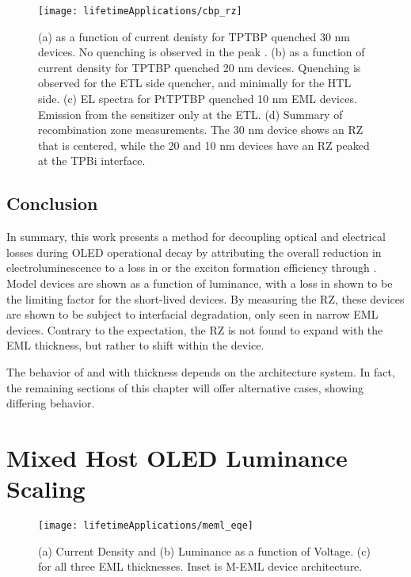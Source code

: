 \documentclass[../thesis.tex]{subfiles}
\begin{document}
\begin{figure}[ht]
\centering
\texttt{[image: lifetimeApplications/cbp\_rz]}
\caption{(a) \eqe as a function of current denisty for TPTBP quenched 30 nm devices.  No quenching is observed in the peak \eqe.  (b) \eqe as a function of current density for TPTBP quenched 20 nm devices.  Quenching is observed for the ETL side quencher, and minimally for the HTL side. (c) EL spectra for PtTPTBP quenched 10 nm EML devices. Emission from the sensitizer only at the ETL. (d) Summary of recombination zone measurements. The 30 nm device shows an RZ that is centered, while the 20 and 10 nm devices have an RZ peaked at the TPBi interface.}
\label{fig:cbp_rz}
\end{figure}

\subsection{Conclusion}

In summary, this work presents a method for decoupling optical and electrical losses during OLED operational decay by attributing the overall reduction in electroluminescence to a loss in \pl or the exciton formation efficiency through \ef.  
Model devices are shown as a function of luminance, with a loss in \ef shown to be the limiting factor for the short-lived devices.  
By measuring the RZ, these devices are shown to be subject to interfacial degradation, only seen in narrow EML devices.
Contrary to the expectation, the RZ is not found to expand with the EML thickness, but rather to shift within the device.

The behavior of \ef and \pl with thickness depends on the architecture system.
In fact, the remaining sections of this chapter will offer alternative cases, showing differing behavior.


\newpage

\clearpage

\section{Mixed Host OLED Luminance Scaling}\label{sec:lifetime_meml}
\begin{wrapfigure}{r}{.4\textwidth}
\centering
\texttt{[image: lifetimeApplications/meml\_eqe]}
\caption{(a) Current Density and (b) Luminance as a function of Voltage.  (c) \eqe for all three EML thicknesses.  Inset is M-EML device architecture.}
\label{fig:meml_eqe}
\end{wrapfigure}
\end{document}

